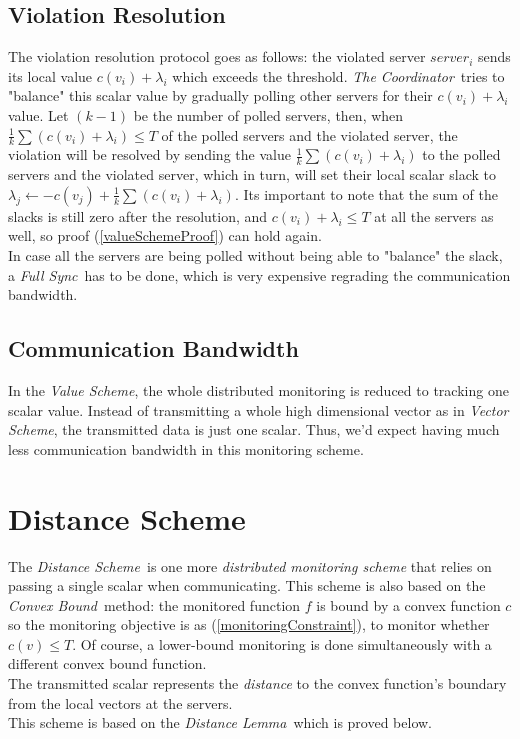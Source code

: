 \documentclass[10pt, conference]{IEEEtran}
\newcommand{\vectorScheme}{\textit{Vector Scheme}}
\newcommand{\valueScheme}{\textit{Value Scheme}}
\newcommand{\distanceScheme}{\textit{Distance Scheme}}
\newcommand{\distanceLemma}{\textit{Distance Lemma}}
\newcommand{\fullSync}{\textit{Full Sync}}
\newcommand{\convexBound}{\textit{Convex Bound}}
\newcommand{\TheCoordinator}{\textit{The Coordinator}}
\begin{document}
\subsection{Violation Resolution}
The violation resolution protocol goes as follows: the violated server $server_i$ sends its local value ${c(v_i) + \lambda _i}$ which exceeds the threshold. \TheCoordinator \ tries to "balance" this scalar value by gradually polling other servers for their ${c(v_i) + \lambda _i}$ value. Let ${(k-1)}$ be the number of polled servers, then, when ${\frac{1}{k}\sum{(c(v_i) + \lambda _i)} \leq T}$ of the polled servers and the violated server, the violation will be resolved by sending the value ${\frac{1}{k}\sum{(c(v_i) + \lambda _i )}}$ to the polled servers and the violated server, which in turn, will set their local scalar slack to ${\lambda _j \leftarrow -c(v_j) + \frac{1}{k}\sum{(c(v_i) + \lambda _i)}}$. Its important to note that the sum of the slacks is still zero after the resolution, and ${c(v_i) + \lambda _i \leq T}$ at all the servers as well, so proof (\ref{valueSchemeProof}) can hold again. \\
In case all the servers are being polled without being able to "balance" the slack, a \fullSync \ has to be done, which is very expensive regrading the communication bandwidth.
\subsection{Communication Bandwidth}
In the \valueScheme , the whole distributed monitoring is reduced to tracking one scalar value. Instead of transmitting a whole high dimensional vector as in \vectorScheme , the transmitted data is just one scalar. Thus, we'd expect having much less communication bandwidth in this monitoring scheme.

\section{Distance Scheme}
The \distanceScheme \ is one more \textit{distributed monitoring scheme} that relies on passing a single scalar when communicating. This scheme is also based on the \convexBound \ method: the monitored function $f$ is bound by a convex function $c$ so the monitoring objective is as (\ref{monitoringConstraint}), to monitor whether ${c(v) \leq T}$. Of course, a lower-bound monitoring is done simultaneously with a different convex bound function. \\
The transmitted scalar represents the \textit{distance} to the convex function's boundary from the local vectors at the servers. \\
This scheme is based on the \distanceLemma \ which is proved below.
\end{document}
